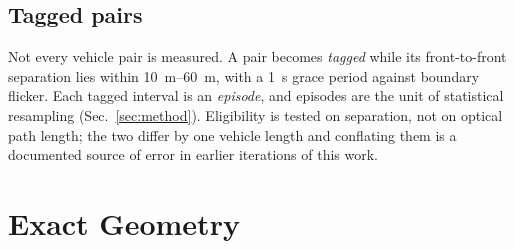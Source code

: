 \documentclass[conference]{IEEEtran}
\begin{document}
\subsection{Tagged pairs}

Not every vehicle pair is measured. A pair becomes \emph{tagged} while its
front-to-front separation lies within \SIrange{10}{60}{\meter}, with a
\SI{1}{\second} grace period against boundary flicker. Each tagged interval is
an \emph{episode}, and episodes are the unit of statistical resampling
(Sec.~\ref{sec:method}). Eligibility is tested on separation, not on optical
path length; the two differ by one vehicle length and conflating them is a
documented source of error in earlier iterations of this work.

\section{Exact Geometry}
\label{sec:geometry}
\end{document}
